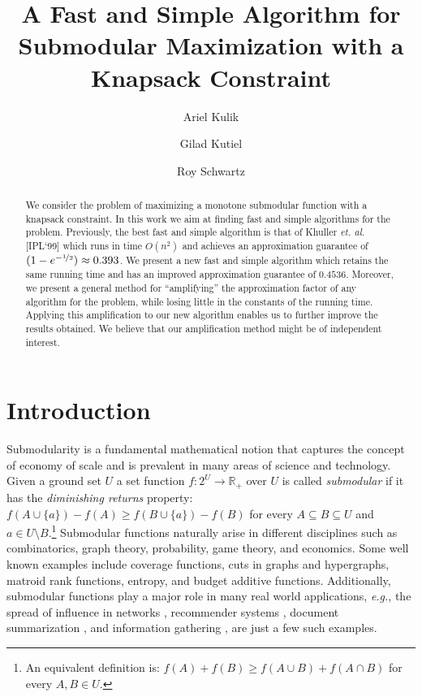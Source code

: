 \documentclass[a4paper,UKenglish,cleveref, autoref]{lipics-v2019}
\title{A Fast and Simple Algorithm for Submodular Maximization with a Knapsack Constraint}
\author{Ariel Kulik}{Department of Computer Science, Technion, Haifa, Israel}{kulik@cs.technion.ac.il}{}{}
\author{Gilad Kutiel}{Department of Computer Science, Technion, Haifa, Israel}{gkutiel@cs.technion.ac.il}{}{}
\author{Roy Schwartz}{Department of Computer Science, Technion, Haifa, Israel}{schwartz@cs.technion.ac.il}{}{}
\begin{document}
\maketitle

\begin{abstract}
We consider the problem of maximizing a monotone submodular function with a knapsack constraint.
In this work we aim at finding fast and simple algorithms for the problem.
Previously, the best fast and simple algorithm is that of Khuller {\em et. al.} [IPL`99] which runs in time $O(n^2)$ and achieves an approximation guarantee of $(1-e^{-\nicefrac[]{1}{2}})\approx 0.393 $.
We present a new fast and simple algorithm which retains the same running time and has an improved approximation guarantee of $0.4536$.
Moreover, we present a general method for ``amplifying'' the approximation factor of any algorithm for the problem, while losing little in the constants of the running time.
Applying this amplification to our new algorithm enables us to further improve the results obtained.
We believe that our amplification method might be of independent interest.

\end{abstract}

\section{Introduction}
Submodularity is a fundamental mathematical notion that captures the concept of economy of scale and is prevalent in many areas of science and technology.
Given a ground set $U$ a set function $f:2^U \to \mathbb{R}_+$ over $U$ is called \emph{submodular} if it has the \emph{diminishing returns} property:
$f(A \cup \{a\}) - f(A) \geq f(B \cup \{a\}) - f(B)$ for every $A \subseteq B \subseteq U$ and $a \in U \setminus B$.\footnote{
    An equivalent definition is: $f(A) + f(B) \geq f(A \cup B) + f(A \cap B)$ for every $A,B \in U$.
}
Submodular functions naturally arise in different disciplines such as combinatorics, graph theory, probability, game theory, and economics.
Some well known examples include coverage functions, cuts in graphs and hypergraphs, matroid rank functions, entropy, and budget additive functions.
Additionally, submodular functions play a major role in many real world applications, {\em e.g.}, the spread of influence in networks \cite{KKT03,KKT05,KKT15,MR10}, recommender systems \cite{EG11,EVSG09}, document summarization \cite{DKR13,LB10,LB11}, and information gathering \cite{GKS05,KG11,KGGK06,KGGK11,KSG08}, are just a few such examples.
\end{document}
